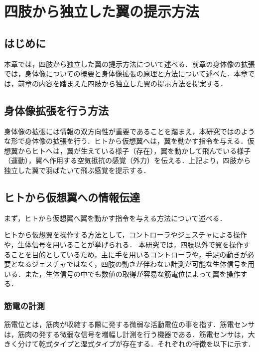 \chapter[四肢から独立した翼の提示方法]%
        {四肢から独立した翼の提示方法}

\section{はじめに}
    本章では，四肢から独立した翼の提示方法について述べる．前章の身体像の拡張では，身体像についての概要と身体像拡張の原理と方法について述べた．本章では，前章の内容を踏まえた四肢から独立した翼の提示方法を提案する．


\section{身体像拡張を行う方法}
    身体像の拡張には情報の双方向性が重要であることを踏まえ，本研究ではのような形で身体像の拡張を行う．ヒトから仮想翼へは，翼を動かす指令を与える．仮想翼からヒトへは，翼が生えている様子（存在），翼を動かして飛んでいる様子（運動），翼へ作用する空気抵抗の感覚（外力）を伝える．上記より，四肢から独立した翼で羽ばたいて飛ぶ感覚を提示する．
    
\section{ヒトから仮想翼への情報伝達}
    まず，ヒトから仮想翼へ翼を動かす指令を与える方法について述べる．

    ヒトから仮想翼を操作する方法として，コントローラやジェスチャによる操作や，生体信号を用いることが挙げられる．
    本研究では，四肢以外で翼を操作することを目的としているため，主に手を用いるコントローラや，手足の動きが必要となるジェスチャではなく，四肢の動きが伴わない計測が可能な生体信号を用いる．また，生体信号の中でも数値の取得が容易な筋電位によって翼を操作する．
    
    \subsection{筋電の計測}
        筋電位とは，筋肉が収縮する際に発する微弱な活動電位の事を指す．筋電センサは，筋肉の発する微弱な信号を増幅し計測を行う機器である\cite{alts-myography}．筋電センサは，大きく分けて乾式タイプと湿式タイプが存在する．それぞれの特徴を以下に示す．

